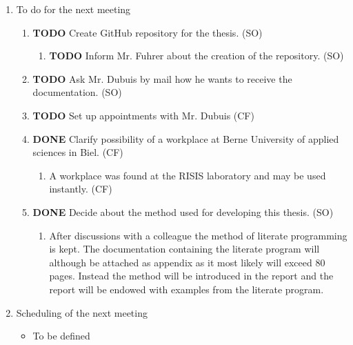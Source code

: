 \documentclass[10pt, openright, notitlepage]{scrreprt}
\begin{document}
\begin{enumerate}
\item To do for the next meeting
\label{sec:orgb5ca7af}

\begin{enumerate}
\item {\bfseries\sffamily TODO} Create GitHub repository for the thesis. (SO)
\label{sec:orge240175}

\begin{enumerate}
\item {\bfseries\sffamily TODO} Inform Mr. Fuhrer about the creation of the repository. (SO)
\label{sec:orged71244}
\end{enumerate}

\item {\bfseries\sffamily TODO} Ask Mr. Dubuis by mail how he wants to receive the documentation. (SO)
\label{sec:org3caae0d}

\item {\bfseries\sffamily TODO} Set up appointments with Mr. Dubuis (CF)
\label{sec:orgffcc5cd}

\item {\bfseries\sffamily DONE} Clarify possibility of a workplace at Berne University of applied sciences in Biel. (CF)
\label{sec:org3f23689}
\begin{enumerate}
\item A workplace was found at the RISIS laboratory and may be used instantly. (CF)
\label{sec:org428bd32}
\end{enumerate}

\item {\bfseries\sffamily DONE} Decide about the method used for developing this thesis. (SO)
\label{sec:org3a9379f}
\begin{enumerate}
\item After discussions with a colleague the method of literate programming is
\label{sec:org532dbdb}
kept. The documentation containing the literate program will although be
attached as appendix as it most likely will exceed 80 pages. Instead the
method will be introduced in the report and the report will be endowed
with examples from the literate program.
\end{enumerate}
\end{enumerate}

\item Scheduling of the next meeting
\label{sec:org260b18a}

\begin{itemize}
\item To be defined
\end{itemize}
\end{enumerate}
\end{document}
